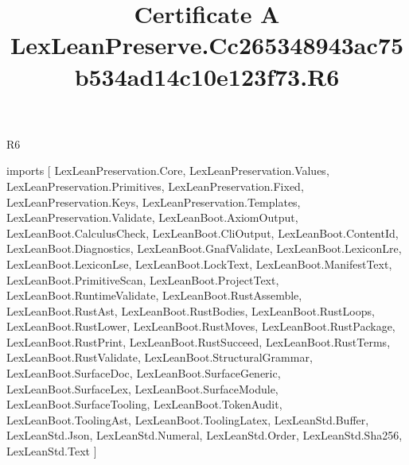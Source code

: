 \begin{lexlean}{R6}
\title{Certificate A LexLeanPreserve.Cc265348943ac75b534ad14c10e123f73.R6}
\begin{coremodule}
imports [
  LexLeanPreservation.Core,
  LexLeanPreservation.Values,
  LexLeanPreservation.Primitives,
  LexLeanPreservation.Fixed,
  LexLeanPreservation.Keys,
  LexLeanPreservation.Templates,
  LexLeanPreservation.Validate,
  LexLeanBoot.AxiomOutput,
  LexLeanBoot.CalculusCheck,
  LexLeanBoot.CliOutput,
  LexLeanBoot.ContentId,
  LexLeanBoot.Diagnostics,
  LexLeanBoot.GnafValidate,
  LexLeanBoot.LexiconLre,
  LexLeanBoot.LexiconLse,
  LexLeanBoot.LockText,
  LexLeanBoot.ManifestText,
  LexLeanBoot.PrimitiveScan,
  LexLeanBoot.ProjectText,
  LexLeanBoot.RuntimeValidate,
  LexLeanBoot.RustAssemble,
  LexLeanBoot.RustAst,
  LexLeanBoot.RustBodies,
  LexLeanBoot.RustLoops,
  LexLeanBoot.RustLower,
  LexLeanBoot.RustMoves,
  LexLeanBoot.RustPackage,
  LexLeanBoot.RustPrint,
  LexLeanBoot.RustSucceed,
  LexLeanBoot.RustTerms,
  LexLeanBoot.RustValidate,
  LexLeanBoot.StructuralGrammar,
  LexLeanBoot.SurfaceDoc,
  LexLeanBoot.SurfaceGeneric,
  LexLeanBoot.SurfaceLex,
  LexLeanBoot.SurfaceModule,
  LexLeanBoot.SurfaceTooling,
  LexLeanBoot.TokenAudit,
  LexLeanBoot.ToolingAst,
  LexLeanBoot.ToolingLatex,
  LexLeanStd.Buffer,
  LexLeanStd.Json,
  LexLeanStd.Numeral,
  LexLeanStd.Order,
  LexLeanStd.Sha256,
  LexLeanStd.Text
]


\end{coremodule}
\end{lexlean}
